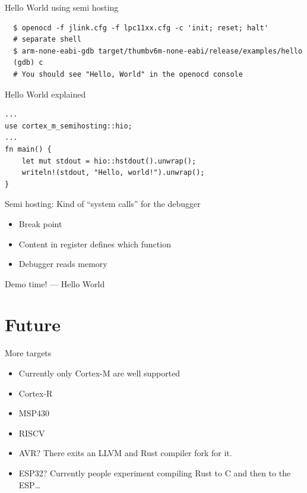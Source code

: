 \documentclass[aspectratio=1610,14pt,t]{beamer}
\begin{document}
\begin{frame}[c,fragile]{Hello World using semi hosting}
  \begin{verbatim}
  $ openocd -f jlink.cfg -f lpc11xx.cfg -c 'init; reset; halt'
  # separate shell
  $ arm-none-eabi-gdb target/thumbv6m-none-eabi/release/examples/hello
  (gdb) c
  # You should see "Hello, World" in the openocd console
  \end{verbatim}
\end{frame}

\begin{frame}[c,fragile]{Hello World explained}
  \begin{verbatim}
...
use cortex_m_semihosting::hio;
...
fn main() {
    let mut stdout = hio::hstdout().unwrap();
    writeln!(stdout, "Hello, world!").unwrap();
}
  \end{verbatim}
\pause Semi hosting: Kind of ``system calls'' for the debugger
  \begin{itemize}
    \item Break point
    \item Content in register defines which function
    \item Debugger reads memory
  \end{itemize}
\end{frame}

\begin{frame}[c]{Demo time! --- Hello World}
\end{frame}

\section{Future}

\begin{frame}[c]{More targets}
  \begin{itemize}
    \item Currently only Cortex-M are well supported
    \item Cortex-R
    \item MSP430
    \item RISCV
    \item<2-> AVR? There exits an LLVM and Rust compiler fork for it.
    \item<2-> ESP32? Currently people experiment compiling Rust to C and then
      to the ESP\ldots
  \end{itemize}
\end{frame}
\end{document}
